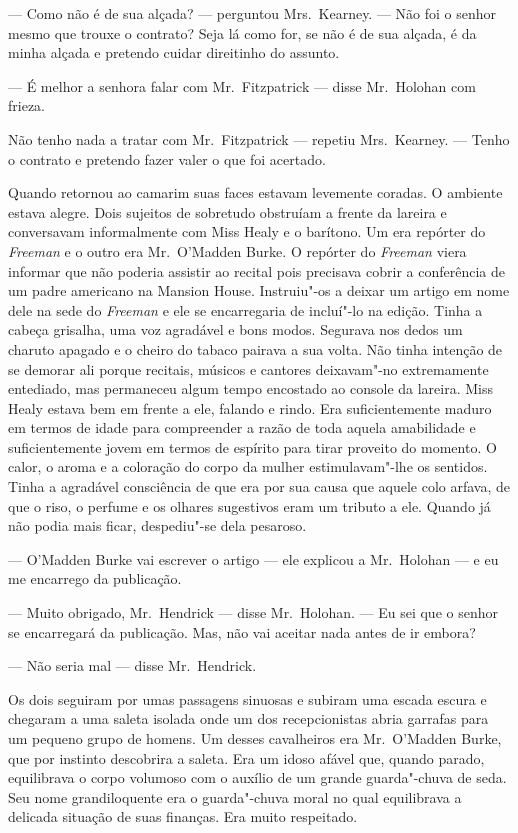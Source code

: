 --- Como não é de sua alçada? --- perguntou Mrs.~Kearney.  --- Não foi o senhor
mesmo que trouxe o contrato?  Seja lá como for, se não é de sua alçada, é da
minha alçada e pretendo cuidar direitinho do assunto.

--- É melhor a senhora falar com Mr.~Fitzpatrick --- disse Mr.~Holohan com
frieza.

Não tenho nada a tratar com Mr.~Fitzpatrick --- repetiu Mrs.~Kearney.  ---
Tenho o contrato e pretendo fazer valer o que foi acertado.

Quando retornou ao camarim suas faces estavam levemente coradas.  O ambiente
estava alegre.  Dois sujeitos de sobretudo obstruíam a frente da lareira e
conversavam informalmente com Miss Healy e o barítono.  Um era repórter do
\textit{Freeman} e o outro era Mr.~O’Madden Burke.  O repórter do
\textit{Freeman} viera informar que não poderia assistir ao recital pois
precisava cobrir a conferência de um padre americano na Mansion House.
Instruiu"-os a deixar um artigo em nome dele na sede do \textit{Freeman} e ele
se encarregaria de incluí"-lo na edição.  Tinha a cabeça grisalha, uma voz
agradável e bons modos.  Segurava nos dedos um charuto apagado e o cheiro do
tabaco pairava a sua volta.  Não tinha intenção de se demorar ali porque
recitais, músicos e cantores deixavam"-no extremamente entediado, mas permaneceu
algum tempo encostado ao console da lareira.  Miss Healy estava bem em frente a
ele, falando e rindo.  Era suficientemente maduro em termos de idade para
compreender a razão de toda aquela amabilidade e suficientemente jovem em
termos de espírito para tirar proveito do momento.  O calor, o aroma e a
coloração do corpo da mulher estimulavam"-lhe os sentidos.  Tinha a agradável
consciência de que era por sua causa que aquele colo arfava, de que o riso, o
perfume e os olhares sugestivos eram um tributo a ele.  Quando já não podia
mais ficar, despediu"-se dela pesaroso.

--- O’Madden Burke vai escrever o artigo --- ele explicou a Mr.~Holohan --- e
eu me encarrego da publicação.

--- Muito obrigado, Mr.~Hendrick --- disse Mr.~Holohan.  --- Eu sei que o
senhor se encarregará da publicação.  Mas, não vai aceitar nada antes de ir
embora?

--- Não seria mal --- disse Mr.~Hendrick.

Os dois seguiram por umas passagens sinuosas e subiram uma escada escura e
chegaram a uma saleta isolada onde um dos recepcionistas abria garrafas para um
pequeno grupo de homens.  Um desses cavalheiros era Mr.~O’Madden Burke, que por
instinto descobrira a saleta.  Era um idoso afável que, quando parado,
equilibrava o corpo volumoso com o auxílio de um grande guarda"-chuva de seda.
Seu nome grandiloquente era o guarda"-chuva moral no qual equilibrava a delicada
situação de suas finanças.  Era muito respeitado.

